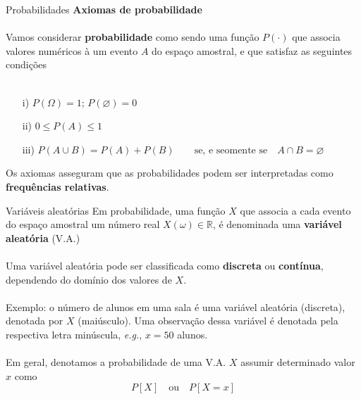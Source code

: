 \documentclass[10pt]{beamer}\usepackage[]{graphicx}\usepackage[]{color}
\providecommand{\eg}{\textit{e.g.}\xspace}
\theoremstyle{definition}
\begin{document}
\begin{frame}[fragile=singleslide]{Probabilidades}
  \textbf{Axiomas de probabilidade} \\~\\
  Vamos considerar \textbf{probabilidade} como sendo uma função
  $P(\cdot)$ que associa valores numéricos à um evento $A$ do espaço
  amostral, e que satisfaz as seguintes condições \\~\\
  \begin{itemize}
  \item[i)] $P(\Omega) = 1$; $P(\varnothing) = 0$
  \item[ii)] $0 \leq P(A) \leq 1$
  \item[iii)] $P(A \cup B) = P(A) + P(B) \quad\quad
    \text{se, e seomente se}\quad A \cap B = \varnothing$
  \end{itemize}
  \vspace{1em}
  Os axiomas asseguram que as probabilidades podem ser interpretadas
  como \textbf{frequências relativas}.
\end{frame}

\begin{frame}[fragile=singleslide]{Variáveis aleatórias}
  Em probabilidade, uma função $X$ que associa a cada evento do espaço
  amostral um número real $X(\omega) \in \mathbb{R}$, é
  denominada uma \textbf{variável aleatória} (V.A.)\\~\\

  Uma variável aleatória pode ser classificada como \textbf{discreta} ou
  \textbf{contínua}, dependendo do domínio dos valores de $X$.\\~\\

  Exemplo: o número de alunos em uma sala é uma variável aleatória
  (discreta), denotada por $X$ (maiúsculo). Uma observação dessa
  variável é denotada pela respectiva letra minúscula, \eg, $x = 50$
  alunos. \\~\\

  Em geral, denotamos a probabilidade de uma V.A. $X$ assumir determinado
  valor $x$ como
  \begin{equation*}
    P[X] \quad \text{ou} \quad P[X = x]
  \end{equation*}

\end{frame}
\end{document}
